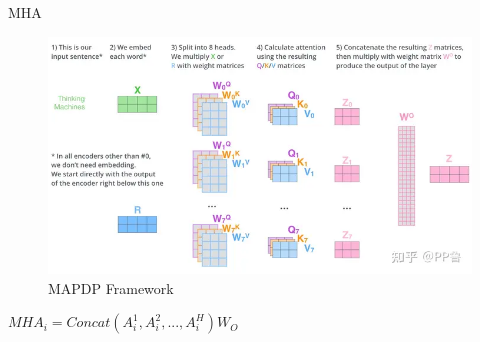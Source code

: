 \documentclass{beamer}
\begin{document}
\begin{frame}{MHA}
	\begin{figure}
		\centering
		\includegraphics[scale=0.35]{MHA.png}
		\caption{MAPDP Framework}
	\end{figure}
	\centering
	$MHA_i=Concat(A_i^1,A_i^2,...,A_i^H)W_O$
\end{frame}
\end{document}
